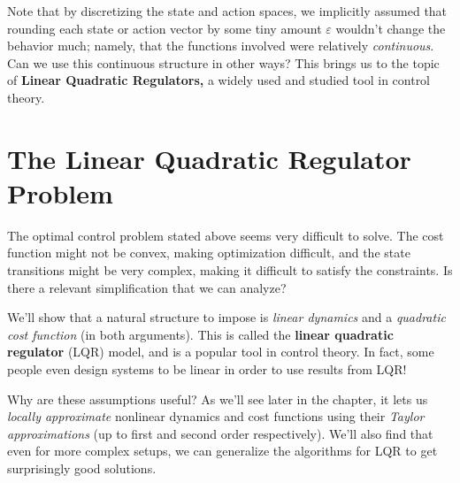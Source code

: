 \documentclass[../main/main]{subfiles}
\begin{document}
Note that by discretizing the state and action spaces, we implicitly assumed that rounding each state or action vector by some tiny amount $\varepsilon$
wouldn't change the behavior much; namely, that the functions involved were relatively \emph{continuous}.
Can we use this continuous structure in other ways? This brings us to the topic of \textbf{Linear Quadratic Regulators,} a widely used and studied tool in control theory.

\section{The Linear Quadratic Regulator Problem} \label{sec:lqr}

The optimal control problem stated above seems very difficult to solve.
The cost function might not be convex, making optimization difficult,
and the state transitions might be very complex, making it difficult to satisfy the constraints.
Is there a relevant simplification that we can analyze?

We'll show that a natural structure to impose is \emph{linear dynamics} and a \emph{quadratic cost function} (in both arguments). This is called the \textbf{linear quadratic regulator} (LQR) model, and is a popular tool in control theory.
In fact, some people even design systems to be linear in order to use results from LQR!

Why are these assumptions useful? As we'll see later in the chapter, it lets us \emph{locally approximate} nonlinear dynamics and cost functions
using their \emph{Taylor approximations} (up to first and second order respectively).
We'll also find that even for more complex setups,
we can generalize the algorithms for LQR to get surprisingly good solutions.
\end{document}
